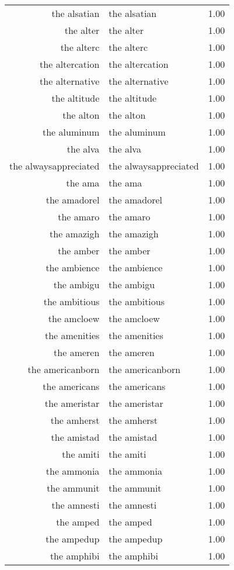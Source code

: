 \begin{table}[ht]
\begin{tabular}{rlr}
  the alsatian & the alsatian & 1.00 \\ 
  the alter & the alter & 1.00 \\ 
  the alterc & the alterc & 1.00 \\ 
  the altercation & the altercation & 1.00 \\ 
  the alternative & the alternative & 1.00 \\ 
  the altitude & the altitude & 1.00 \\ 
  the alton & the alton & 1.00 \\ 
  the aluminum & the aluminum & 1.00 \\ 
  the alva & the alva & 1.00 \\ 
  the alwaysappreciated & the alwaysappreciated & 1.00 \\ 
  the ama & the ama & 1.00 \\ 
  the amadorel & the amadorel & 1.00 \\ 
  the amaro & the amaro & 1.00 \\ 
  the amazigh & the amazigh & 1.00 \\ 
  the amber & the amber & 1.00 \\ 
  the ambience & the ambience & 1.00 \\ 
  the ambigu & the ambigu & 1.00 \\ 
  the ambitious & the ambitious & 1.00 \\ 
  the amcloew & the amcloew & 1.00 \\ 
  the amenities & the amenities & 1.00 \\ 
  the ameren & the ameren & 1.00 \\ 
  the americanborn & the americanborn & 1.00 \\ 
  the americans & the americans & 1.00 \\ 
  the ameristar & the ameristar & 1.00 \\ 
  the amherst & the amherst & 1.00 \\ 
  the amistad & the amistad & 1.00 \\ 
  the amiti & the amiti & 1.00 \\ 
  the ammonia & the ammonia & 1.00 \\ 
  the ammunit & the ammunit & 1.00 \\ 
  the amnesti & the amnesti & 1.00 \\ 
  the amped & the amped & 1.00 \\ 
  the ampedup & the ampedup & 1.00 \\ 
  the amphibi & the amphibi & 1.00 \\ 

\end{tabular}
\end{table}
